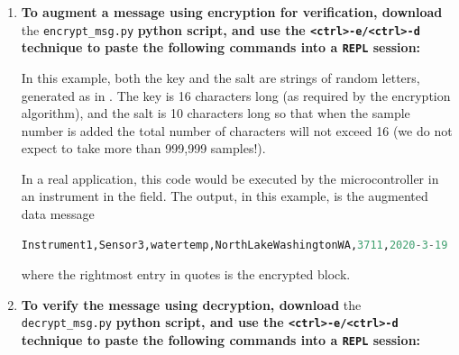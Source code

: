 \begin{enumerate}
	\item \textbf{To augment a message using encryption for verification, download} the \lstinline{encrypt_msg.py} \textbf{python script, and use the \lstinline{<ctrl>-e/<ctrl>-d} technique to paste the following commands into a \texttt{REPL} session:}
	

	In this example, both the key and the salt are strings of random letters, generated as in .
	The key is 16 characters long (as required by the encryption algorithm), and the salt is 10 characters long so that when the sample number is added the total number of characters will not exceed 16 (we do not expect to take more than 999,999 samples!).

	In a real application, this code would be executed by the microcontroller in an instrument in the field.
	The output, in this example, is the augmented data message
\begin{lstlisting}[language=Python]
Instrument1,Sensor3,watertemp,NorthLakeWashingtonWA,3711,2020-3-19 1:20:17,7.6875,b'$\\xd8\\xd8\\xa5\\x93D\\xd1\\xb3\\xd9=\\xa8$x\\xf6n\\xce'
\end{lstlisting}
	where the rightmost entry in quotes is the encrypted block.

	\item \textbf{To verify the message using decryption, download} the \lstinline{decrypt_msg.py} \textbf{python script, and use the \lstinline{<ctrl>-e/<ctrl>-d} technique to paste the following commands into a \texttt{REPL} session:}



\end{enumerate}
